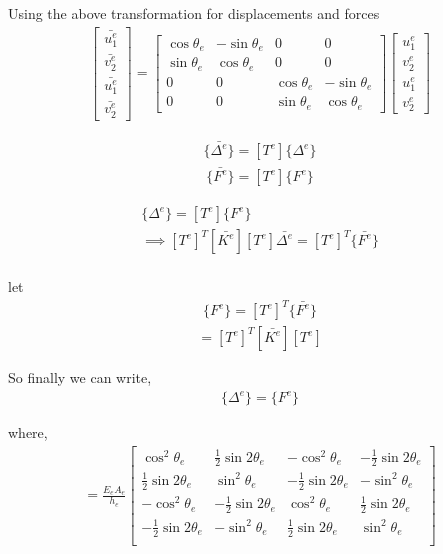 Using the above transformation for displacements and forces
\begin{eqnarray}
\begin{bmatrix}
	\bar{u_1^e} \\
	\bar{v_2^e} \\
	\bar{u_1^e} \\
	\bar{v_2^e}
\end{bmatrix} =
\begin{bmatrix}
		\cos{\theta_e} & -\sin{\theta_e} & 0 & 0\\
		\sin{\theta_e} & \cos{\theta_e} & 0 & 0\\
		0 &  0 &\cos{\theta_e} & -\sin{\theta_e} \\
		0& 0& \sin{\theta_e} & \cos{\theta_e}  
\end{bmatrix}
\begin{bmatrix}
{u_1^e} \\
{v_2^e} \\
{u_1^e} \\
{v_2^e}
\end{bmatrix}
\end{eqnarray}

\begin{eqnarray}	
\{\bar{\Delta^e}\} = [T^e]  \{\Delta^e\}
\end{eqnarray}
\begin{eqnarray}	
\{\bar{F^e}\} = [T^e]  \{F^e\}
\end{eqnarray}

\begin{eqnarray}	
	[\bar{K^e}][T^e]  \{\Delta^e\} = [T^e]  \{F^e\}\\
	\implies [T^e]^T [\bar{K^e}] [T^e] {\bar{\Delta^e}} =  [T^e]^T \{\bar{F^e}\}\\
\end{eqnarray}

let 
\begin{eqnarray}
	\{ F^e \}=[T^e]^T \{ \bar{F^e} \}
\end{eqnarray}
\begin{eqnarray}
	[K^e] =  [T^e]^T [\bar{K^e}] [T^e]
\end{eqnarray}

So finally we can write,
\begin{eqnarray}	
	[{K^e}]\{{\Delta^e}\} = \{{F^e}\}
\end{eqnarray}

where,
\begin{eqnarray}
[K^e] = \frac{E_e A_e}{h_e}
	\begin{bmatrix}
		\cos^2{\theta_e} & \frac{1}{2}\sin{2\theta_e} & -\cos^2{\theta_e} & -\frac{1}{2}\sin{2\theta_e}\\
		\frac{1}{2}\sin{2\theta_e} & \sin^2{\theta_e} & -\frac{1}{2}\sin{2\theta_e} & -\sin^2{\theta_e}\\
			-\cos^2{\theta_e} & -\frac{1}{2}\sin{2\theta_e} & \cos^2{\theta_e} & \frac{1}{2}\sin{2\theta_e}\\
		-\frac{1}{2}\sin{2\theta_e} & -\sin^2{\theta_e} & \frac{1}{2}\sin{2\theta_e} & \sin^2{\theta_e}\\
	\end{bmatrix}
\end{eqnarray}

